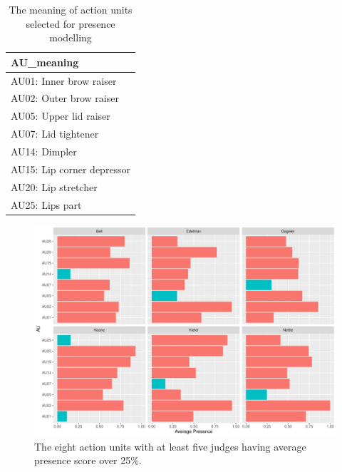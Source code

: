 \documentclass{monashthesis}
\begin{document}
\begin{table}

\caption{\label{tab:au-presence}The meaning of action units selected for presence modelling}
\centering
\begin{tabular}[t]{l}
\hline
AU\_meaning\\
\hline
AU01: Inner brow raiser\\
\hline
AU02: Outer brow raiser\\
\hline
AU05: Upper lid raiser\\
\hline
AU07: Lid tightener\\
\hline
AU14: Dimpler\\
\hline
AU15: Lip corner depressor\\
\hline
AU20: Lip stretcher\\
\hline
AU25: Lips part\\
\hline
\end{tabular}
\end{table}

\begin{figure}

{\centering \includegraphics[width=1\linewidth]{figures/selected-au-presence-1} 

}

\caption{The eight action units with at least five judges having average presence score over 25\%.}\label{fig:selected-au-presence}
\end{figure}
\end{document}

